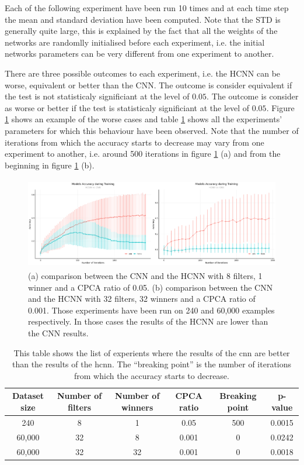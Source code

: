 \documentclass[11pt]{report}
\begin{document}
\noindent Each of the following experiment have been run 10 times and at each time step the mean and standard deviation have been computed. Note that the STD is generally quite large, this is explained by the fact that all the weights of the networks are randomlly initialised before each experiment, i.e. the initial networks parameters can be very different from one experiment to another.
\newline

\noindent There are three possible outcomes to each experiment, i.e. the HCNN can be worse, equivalent or better than the CNN. The outcome is consider equivalent if the test is not statisticaly significiant at the level of $0.05$. The outcome is consider as worse or better if the test is statisticaly significiant at the level of $0.05$. Figure \ref{fig:hcnn_worse} shows an example of the worse cases and table \ref{table:hcnn_worse} shows all the experiments' parameters for which this behaviour have been observed. Note that the number of iterations from which the accuracy starts to decrease may vary from one experiment to another, i.e. around 500 iterations in figure \ref{fig:hcnn_worse} (a) and from the beginning in figure \ref{fig:hcnn_worse} (b).

\begin{figure}[h]
\centering
\includegraphics[width=13cm, height=4cm]{hcnn_worse}
\caption[Illustration of two experiments where the CNN is better than the HCNN.]{(a) comparison between the CNN and the HCNN with 8 filters, 1 winner and a CPCA ratio of 0.05. (b) comparison between the CNN and the HCNN with 32 filters, 32 winners and a CPCA ratio of 0.001. Those experiments have been run on 240 and 60,000 examples respectively. In those cases the results of the HCNN are lower than the CNN results.}
\label{fig:hcnn_worse}
\end{figure}

\begin{table}[h!]
\centering
\begin{tabular}{ c c c c c c }
Dataset size & Number of filters & Number of winners & CPCA ratio & Breaking  point & p-value\\
\hline
240 & 8 & 1 & 0.05 & 500 & 0.0015\\
60,000 & 32 & 8 & 0.001 & 0 & 0.0242\\
60,000 & 32 & 32 & 0.001 & 0 & 0.0018
\end{tabular}
\caption[Benchmark where the \acrshort{cnn} is better than the \acrshort{hcnn}.]{This table shows the list of experients where the results of the \acrshort{cnn} are better than the results of the \acrshort{hcnn}. The ``breaking point'' is the number of iterations from which the accuracy starts to decrease.}
\label{table:hcnn_worse}
\end{table}
\newpage
\end{document}
